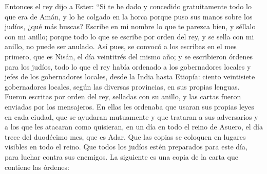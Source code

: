  Entonces el rey dijo a Ester: ``Si te he dado y concedido
gratuitamente todo lo que era de Amán, y lo he colgado en la horca
porque puso sus manos sobre los judíos, ¿qué más buscas? 
Escribe en mi nombre lo que te parezca bien, y séllalo con mi anillo;
porque todo lo que se escribe por orden del rey, y se sella con mi
anillo, no puede ser anulado.  Así pues, se convocó a los
escribas en el mes primero, que es Nisán, el día veintitrés del mismo
año; y se escribieron órdenes para los judíos, todo lo que el rey había
ordenado a los gobernadores locales y jefes de los gobernadores locales,
desde la India hasta Etiopía: ciento veintisiete gobernadores locales,
según las diversas provincias, en sus propias lenguas. 
Fueron escritas por orden del rey, selladas con su anillo, y las cartas
fueron enviadas por los mensajeros.  En ellas les
ordenaba que usaran sus propias leyes en cada ciudad, que se ayudaran
mutuamente y que trataran a sus adversarios y a los que les atacaran
como quisieran,  en un día en todo el reino de Asuero, el
día trece del duodécimo mes, que es Adar.  Que las copias
se coloquen en lugares visibles en todo el reino. Que todos los judíos
estén preparados para este día, para luchar contra sus enemigos. La
siguiente es una copia de la carta que contiene las órdenes:

